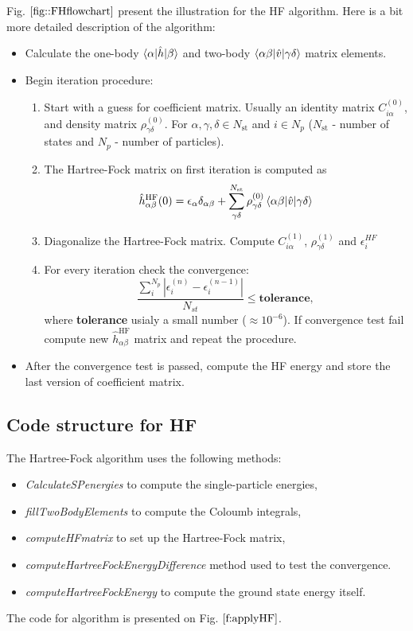 \documentclass[twoside,english]{uiofysmaster}
\theoremstyle{definition}
\begin{document}
Fig. $\ref{fig::FHflowchart}$ present the illustration for the HF algorithm. Here is a bit more detailed description of the algorithm:
\begin{tcolorbox}
	\begin{itemize}
		\item Calculate the one-body $\braket{\alpha|\hat{h}|\beta}$ and two-body $\braket{\alpha\beta|\hat{v}|\gamma\delta}$ matrix elements.  \\
		\item Begin iteration procedure:
		\begin{enumerate}
			\item Start with a guess for coefficient matrix. Usually an identity matrix $C^{(0)}_{i\alpha}$,  and density matrix $\rho^{(0)}_{\gamma\delta}$. For $\alpha, \gamma, \delta \in N_{\text{st}}$ and $i \in N_{p}$ ($N_{\text{st}}$ - number of states and $N_{p}$ - number of particles). 
			\item The Hartree-Fock matrix on first iteration is computed as 
			 \[ \hat{h}^{\text{HF}}_{\alpha \beta}(0) = \epsilon_\alpha \delta_{\alpha\beta} + \sum_{\gamma\delta}^{N_{\text{st}}} \rho^{(0)}_{\gamma\delta} \braket{\alpha\beta|\hat{v}|\gamma\delta}  \] 
			 \item Diagonalize the Hartree-Fock matrix. Compute  $C^{(1)}_{i\alpha}$,   $\rho^{(1)}_{\gamma\delta}$ and $\epsilon_i^{HF}$
			 \item For every iteration check the convergence:
			 \[\frac{\sum_{i}^{N_p} |\epsilon_i^{(n)}- \epsilon_i^{(n-1)}|}{N_{st}} \leq \textbf{tolerance},\]
			 where \textbf{tolerance} usialy a small number ($\approx 10^{-6}$). If convergence test fail compute new $\hat{h}^{\text{HF}}_{\alpha \beta}$ matrix and repeat the procedure.			 	
		\end{enumerate} 
		\item After the convergence test is passed, compute the HF energy and store the last version of coefficient matrix. 
	\end{itemize}
\end{tcolorbox}

\subsection{Code structure for HF}\label{sec:code_for_HF}
The Hartree-Fock algorithm uses the following methods:
\begin{itemize}
\item \textit{CalculateSPenergies} to compute the single-particle energies,
\item \textit{fillTwoBodyElements} to compute the Coloumb integrals,
\item \textit{computeHFmatrix} to set up the Hartree-Fock matrix,
\item \textit{computeHartreeFockEnergyDifference} method used to test the convergence.
\item \textit{computeHartreeFockEnergy} to compute the ground state energy itself.
\end{itemize}
The code for algorithm is presented on Fig. $\ref{f:applyHF}$.
 
\end{document}
